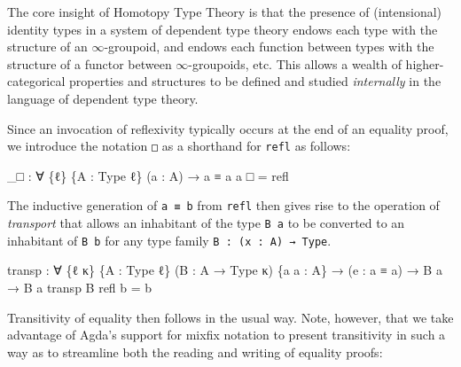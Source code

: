 \documentclass[
  11pt,
  oneside,
  article]{memoir}
\newenvironment{Shaded}{}{}
\newcommand{\NormalTok}[1]{#1}
\newcommand{\OtherTok}[1]{\textcolor[rgb]{0.00,0.44,0.13}{#1}}
\theoremstyle{definition}
\theoremstyle{plain}
\newcommand{\0}{\textsf{0}}
\newcommand{\1}{\tn{\textsf{1}}}
\begin{document}
The core insight of Homotopy Type Theory is that the presence of
(intensional) identity types in a system of dependent type theory endows
each type with the structure of an \(\infty\)-groupoid, and endows each
function between types with the structure of a functor between
\(\infty\)-groupoids, etc. This allows a wealth of higher-categorical
properties and structures to be defined and studied \emph{internally} in
the language of dependent type theory.

Since an invocation of reflexivity typically occurs at the end of an
equality proof, we introduce the notation \texttt{□} as a shorthand for
\texttt{refl} as follows:

\begin{Shaded}
\begin{Highlighting}[]
\OtherTok{\_}\NormalTok{□ }\OtherTok{:} \OtherTok{∀} \OtherTok{\{}\NormalTok{ℓ}\OtherTok{\}} \OtherTok{\{}\NormalTok{A }\OtherTok{:}\NormalTok{ Type ℓ}\OtherTok{\}} \OtherTok{(}\NormalTok{a }\OtherTok{:}\NormalTok{ A}\OtherTok{)} \OtherTok{→}\NormalTok{ a ≡ a}
\NormalTok{a □ }\OtherTok{=}\NormalTok{ refl}
\end{Highlighting}
\end{Shaded}

The inductive generation of \texttt{a\ ≡\ b} from \texttt{refl} then
gives rise to the operation of \emph{transport} that allows an
inhabitant of the type \texttt{B\ a} to be converted to an inhabitant of
\texttt{B\ b} for any type family \texttt{B\ :\ (x\ :\ A)\ →\ Type}.

\begin{Shaded}
\begin{Highlighting}[]
\NormalTok{transp }\OtherTok{:} \OtherTok{∀} \OtherTok{\{}\NormalTok{ℓ κ}\OtherTok{\}} \OtherTok{\{}\NormalTok{A }\OtherTok{:}\NormalTok{ Type ℓ}\OtherTok{\}} \OtherTok{(}\NormalTok{B }\OtherTok{:}\NormalTok{ A }\OtherTok{→}\NormalTok{ Type κ}\OtherTok{)} \OtherTok{\{}\NormalTok{a a\textquotesingle{} }\OtherTok{:}\NormalTok{ A}\OtherTok{\}} 
         \OtherTok{→} \OtherTok{(}\NormalTok{e }\OtherTok{:}\NormalTok{ a ≡ a\textquotesingle{}}\OtherTok{)} \OtherTok{→}\NormalTok{ B a }\OtherTok{→}\NormalTok{ B a\textquotesingle{}}
\NormalTok{transp B refl b }\OtherTok{=}\NormalTok{ b}
\end{Highlighting}
\end{Shaded}

Transitivity of equality then follows in the usual way. Note, however,
that we take advantage of Agda's support for mixfix notation to present
transitivity in such a way as to streamline both the reading and writing
of equality proofs:
\end{document}
